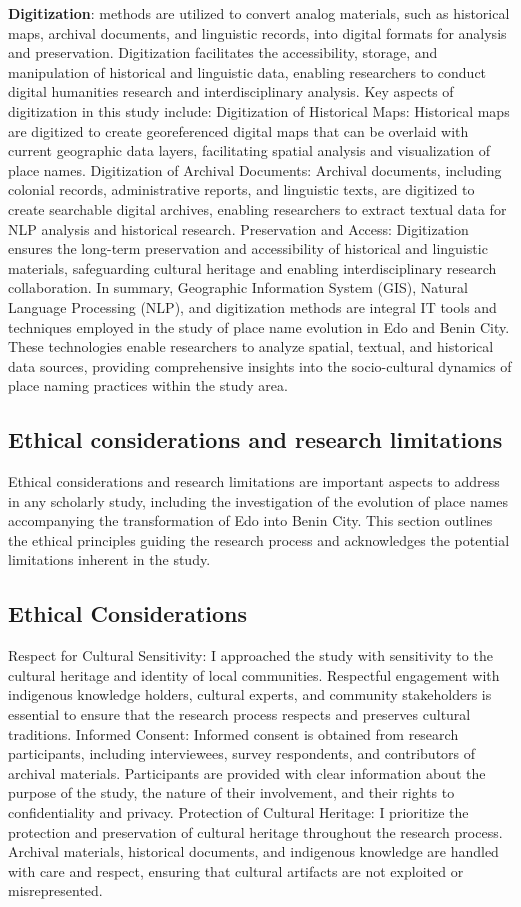 \textbf{Digitization}: methods are utilized to convert analog materials, such as historical maps, archival documents, and linguistic records, into digital formats for analysis and preservation. Digitization facilitates the accessibility, storage, and manipulation of historical and linguistic data, enabling researchers to conduct digital humanities research and interdisciplinary analysis. Key aspects of digitization in this study include:
Digitization of Historical Maps: Historical maps are digitized to create georeferenced digital maps that can be overlaid with current geographic data layers, facilitating spatial analysis and visualization of place names.
Digitization of Archival Documents: Archival documents, including colonial records, administrative reports, and linguistic texts, are digitized to create searchable digital archives, enabling researchers to extract textual data for NLP analysis and historical research.
Preservation and Access: Digitization ensures the long-term preservation and accessibility of historical and linguistic materials, safeguarding cultural heritage and enabling interdisciplinary research collaboration.
In summary, Geographic Information System (GIS), Natural Language Processing (NLP), and digitization methods are integral IT tools and techniques employed in the study of place name evolution in Edo and Benin City. These technologies enable researchers to analyze spatial, textual, and historical data sources, providing comprehensive insights into the socio-cultural dynamics of place naming practices within the study area.
\subsection{Ethical considerations and research limitations}
Ethical considerations and research limitations are important aspects to address in any scholarly study, including the investigation of the evolution of place names accompanying the transformation of Edo into Benin City. This section outlines the ethical principles guiding the research process and acknowledges the potential limitations inherent in the study.
\subsection{Ethical Considerations}
Respect for Cultural Sensitivity: I approached the study with sensitivity to the cultural heritage and identity of local communities. Respectful engagement with indigenous knowledge holders, cultural experts, and community stakeholders is essential to ensure that the research process respects and preserves cultural traditions.
Informed Consent: Informed consent is obtained from research participants, including interviewees, survey respondents, and contributors of archival materials. Participants are provided with clear information about the purpose of the study, the nature of their involvement, and their rights to confidentiality and privacy.
Protection of Cultural Heritage: I prioritize the protection and preservation of cultural heritage throughout the research process. Archival materials, historical documents, and indigenous knowledge are handled with care and respect, ensuring that cultural artifacts are not exploited or misrepresented.

